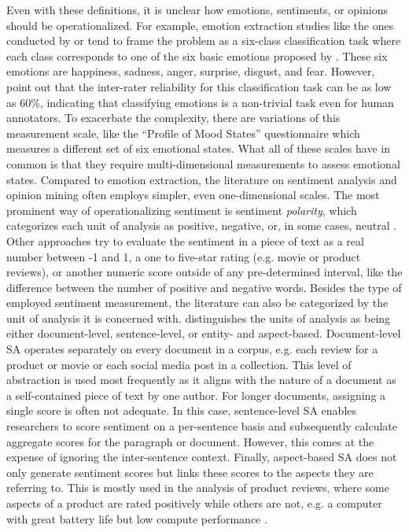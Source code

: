 Even with these definitions, it is unclear how emotions, sentiments, or opinions should be operationalized. For example, emotion extraction studies like the ones conducted by  or  tend to frame the problem as a six-class classification task where each class corresponds to one of the six basic emotions proposed by . These six emotions are happiness, sadness, anger, surprise, disgust, and fear. However,  point out that the inter-rater reliability for this classification task can be as low as 60\%, indicating that classifying emotions is a non-trivial task even for human annotators. To exacerbate the complexity, there are variations of this measurement scale, like the ``Profile of Mood States'' questionnaire  which measures a different set of six emotional states. What all of these scales have in common is that they require multi-dimensional measurements to assess emotional states. \newline
Compared to emotion extraction, the literature on sentiment analysis and opinion mining often employs simpler, even one-dimensional scales. The most prominent way of operationalizing sentiment is sentiment \emph{polarity}, which categorizes each unit of analysis as positive, negative, or, in some cases, neutral \cite{ravi2015survey}. Other approaches try to evaluate the sentiment in a piece of text as a real number between -1 and 1, a one to five-star rating (e.g. movie or product reviews), or another numeric score outside of any pre-determined interval, like the difference between the number of positive and negative words.\newline
Besides the type of employed sentiment measurement, the literature can also be categorized by the unit of analysis it is concerned with.  distinguishes the units of analysis as being either document-level, sentence-level, or entity- and aspect-based. Document-level SA operates separately on every document in a corpus, e.g. each review for a product or movie or each social media post in a collection. This level of abstraction is used most frequently as it aligns with the nature of a document as a self-contained piece of text by one author. For longer documents, assigning a single score is often not adequate. In this case, sentence-level SA enables researchers to score sentiment on a per-sentence basis and subsequently calculate aggregate scores for the paragraph or document. However, this comes at the expense of ignoring the inter-sentence context. Finally, aspect-based SA does not only generate sentiment scores but links these scores to the aspects they are referring to. This is mostly used in the analysis of product reviews, where some aspects of a product are rated positively while others are not, e.g. a computer with great battery life but low compute performance .

